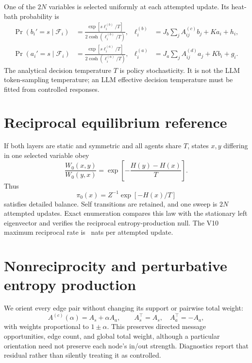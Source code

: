 \documentclass[12pt]{article}
\begin{document}
One of the $2N$ variables is selected uniformly at each attempted update. Its
heat-bath probability is
\begin{align}
 \Pr(b_i'=s\mid\mathcal F_i)&=
 \frac{\exp[s\ell_i^{(b)}/T]}{2\cosh(\ell_i^{(b)}/T)},
 &\ell_i^{(b)}&=J_b\sum_jA^{(c)}_{ij}b_j+Ka_i+h_i,\\
 \Pr(a_i'=s\mid\mathcal F_i)&=
 \frac{\exp[s\ell_i^{(a)}/T]}{2\cosh(\ell_i^{(a)}/T)},
 &\ell_i^{(a)}&=J_a\sum_jA^{(d)}_{ij}a_j+Kb_i+g_i.
\end{align}
The analytical decision temperature $T$ is policy stochasticity.  It is not the
LLM token-sampling temperature; an LLM effective decision temperature must be
fitted from controlled responses.

\section{Reciprocal equilibrium reference}

If both layers are static and symmetric and all agents share $T$, states $x,y$
differing in one selected variable obey
\begin{equation}
 \frac{W_0(x,y)}{W_0(y,x)}=
 \exp\left[-\frac{H(y)-H(x)}{T}\right].
\end{equation}
Thus
\begin{equation}
 \pi_0(x)=Z^{-1}\exp[-H(x)/T]
\end{equation}
satisfies detailed balance. Self transitions are retained, and one sweep is
$2N$ attempted updates. Exact enumeration compares this law with the stationary
left eigenvector and verifies the reciprocal entropy-production null. The V10
maximum reciprocal rate is \ResultReciprocalEPR\ nats per attempted update.

\section{Nonreciprocity and perturbative entropy production}

We orient every edge pair without changing its support or pairwise total weight:
\begin{equation}
 A^{(c)}(\alpha)=A_s+\alpha A_a,\qquad
 A_s^\top=A_s,\quad A_a^\top=-A_a,
 \label{eq:directed}
\end{equation}
with weights proportional to $1\pm\alpha$. This preserves directed message
opportunities, edge count, and global total weight, although a particular
orientation need not preserve each node's in/out strength. Diagnostics report
that residual rather than silently treating it as controlled.
\end{document}
